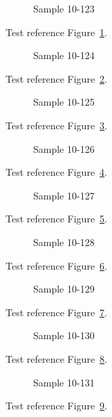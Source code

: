 \begin{figure}[tbhp]
\caption{Sample 10-123}
\label{fig:sample-10-123}
\end{figure}

Test reference Figure~\ref{fig:sample-10-123}.

\begin{figure}[tbhp]
\caption{Sample 10-124}
\label{fig:sample-10-124}
\end{figure}

Test reference Figure~\ref{fig:sample-10-124}.

\begin{figure}[tbhp]
\caption{Sample 10-125}
\label{fig:sample-10-125}
\end{figure}

Test reference Figure~\ref{fig:sample-10-125}.

\begin{figure}[tbhp]
\caption{Sample 10-126}
\label{fig:sample-10-126}
\end{figure}

Test reference Figure~\ref{fig:sample-10-126}.

\begin{figure}[tbhp]
\caption{Sample 10-127}
\label{fig:sample-10-127}
\end{figure}

Test reference Figure~\ref{fig:sample-10-127}.

\begin{figure}[tbhp]
\caption{Sample 10-128}
\label{fig:sample-10-128}
\end{figure}

Test reference Figure~\ref{fig:sample-10-128}.

\begin{figure}[tbhp]
\caption{Sample 10-129}
\label{fig:sample-10-129}
\end{figure}

Test reference Figure~\ref{fig:sample-10-129}.

\begin{figure}[tbhp]
\caption{Sample 10-130}
\label{fig:sample-10-130}
\end{figure}

Test reference Figure~\ref{fig:sample-10-130}.

\begin{figure}[tbhp]
\caption{Sample 10-131}
\label{fig:sample-10-131}
\end{figure}

Test reference Figure~\ref{fig:sample-10-131}.

